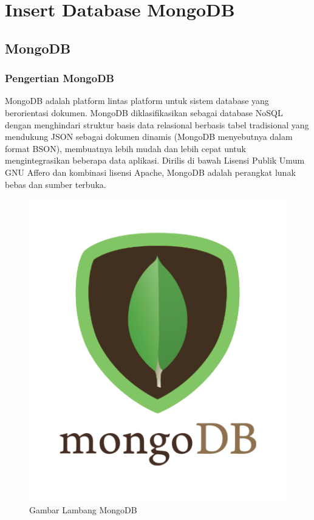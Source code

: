 
\section{Insert Database MongoDB}
\subsection{MongoDB}
\subsubsection {Pengertian MongoDB}
MongoDB adalah platform lintas platform untuk sistem database yang berorientasi  dokumen. 
MongoDB diklasifikasikan sebagai database NoSQL dengan menghindari struktur basis data relasional berbasis tabel tradisional yang mendukung JSON sebagai dokumen dinamis (MongoDB menyebutnya dalam format BSON), membuatnya lebih mudah dan lebih cepat untuk mengintegrasikan beberapa data aplikasi. 
Dirilis di bawah Lisensi Publik Umum GNU Affero dan kombinasi lisensi Apache, MongoDB adalah perangkat lunak bebas dan sumber terbuka.

	\begin{figure}[ht]
	\centerline{\includegraphics[width=1\textwidth]{figures/mongodb-1.JPEG}}
	\caption{Gambar Lambang MongoDB}
	\label{Gambar}
	\end{figure}
      
